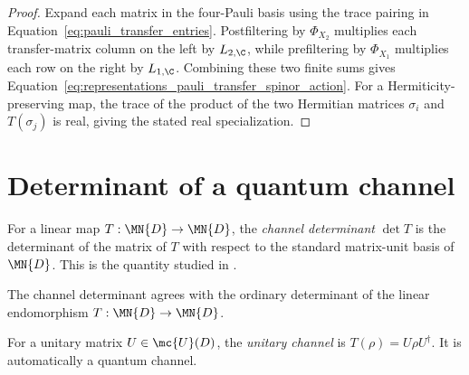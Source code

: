 \begin{proof}\leanok
    Expand each matrix in the four-Pauli basis using the trace pairing in
    Equation~\ref{eq:pauli_transfer_entries}. Postfiltering by $\Phi_{X_2}$
    multiplies each transfer-matrix column on the left by $L_{2,\C}$, while
    prefiltering by $\Phi_{X_1}$ multiplies each row on the right by
    $L_{1,\C}$. Combining these two finite sums gives
    Equation~\ref{eq:representations_pauli_transfer_spinor_action}. For a
    Hermiticity-preserving map, the trace of the product of the two Hermitian
    matrices $\sigma_i$ and $T(\sigma_j)$ is real, giving the stated real
    specialization.
\end{proof}


\section{Determinant of a quantum channel}
\label{sec:channel_determinant}


\begin{definition}\label{def:channel_det}
    \leanok
    For a linear map $T : \MN{D} \to \MN{D}$, the
    \emph{channel determinant} $\det T$ is the determinant of the
    matrix of $T$ with respect to the standard matrix-unit basis
    of $\MN{D}$.
    This is the quantity studied in \cite[Section~6.1]{Wolf2012Quantum}.
\end{definition}

\begin{remark}
    \label{rem:channel_det_linearMap_det}
    \leanok
    The channel determinant agrees with the ordinary determinant of the linear
    endomorphism $T : \MN{D} \to \MN{D}$.
\end{remark}

\begin{definition}\label{def:unitary_channel}
    \leanok
    For a unitary matrix $U \in \mc{U}(D)$, the
    \emph{unitary channel} is $T(\rho)=U\rho U^\dagger$.
    It is automatically a quantum channel.
\end{definition}

